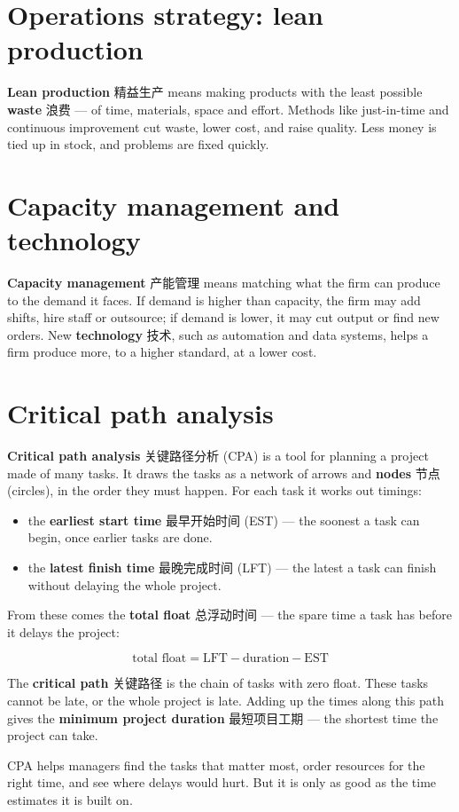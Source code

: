 \documentclass[11pt]{article}
\begin{document}
\section*{Operations strategy: lean production}

\textbf{Lean production} 精益生产 means making products with the least possible \textbf{waste} 浪费 — of time, materials, space and effort. Methods like just-in-time and continuous improvement cut waste, lower cost, and raise quality. Less money is tied up in stock, and problems are fixed quickly.

\section*{Capacity management and technology}

\textbf{Capacity management} 产能管理 means matching what the firm can produce to the demand it faces. If demand is higher than capacity, the firm may add shifts, hire staff or outsource; if demand is lower, it may cut output or find new orders. New \textbf{technology} 技术, such as automation and data systems, helps a firm produce more, to a higher standard, at a lower cost.

\section*{Critical path analysis}

\textbf{Critical path analysis} 关键路径分析 (CPA) is a tool for planning a project made of many tasks. It draws the tasks as a network of arrows and \textbf{nodes} 节点 (circles), in the order they must happen. For each task it works out timings:

\begin{itemize}
\item the \textbf{earliest start time} 最早开始时间 (EST) — the soonest a task can begin, once earlier tasks are done.

\item the \textbf{latest finish time} 最晚完成时间 (LFT) — the latest a task can finish without delaying the whole project.

\end{itemize}

From these comes the \textbf{total float} 总浮动时间 — the spare time a task has before it delays the project:

\[
\text{total float} = \text{LFT} - \text{duration} - \text{EST}
\]

The \textbf{critical path} 关键路径 is the chain of tasks with zero float. These tasks cannot be late, or the whole project is late. Adding up the times along this path gives the \textbf{minimum project duration} 最短项目工期 — the shortest time the project can take.

CPA helps managers find the tasks that matter most, order resources for the right time, and see where delays would hurt. But it is only as good as the time estimates it is built on.
\end{document}
